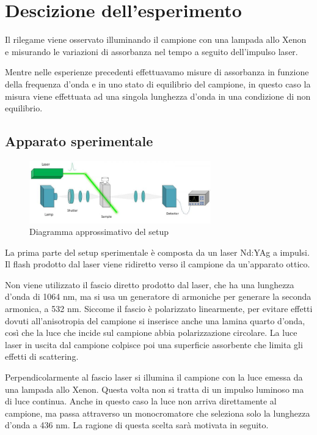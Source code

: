 \documentclass[11pt, a4paper]{article}
\begin{document}
\section{Descizione dell'esperimento}

Il rilegame viene osservato illuminando il campione con una lampada allo Xenon e misurando le variazioni di assorbanza nel tempo a seguito dell'impulso laser.

Mentre nelle esperienze precedenti effettuavamo misure di assorbanza in funzione della frequenza d'onda e in uno stato di equilibrio del campione,
in questo caso la misura viene effettuata ad una singola lunghezza d'onda in una condizione di non equilibrio.

\subsection{Apparato sperimentale}

\begin{figure}[H]
    \centering
    \includegraphics[width=0.7\textwidth]{FlashPhotolysis.jpg}
    \caption{Diagramma approssimativo del setup}
\end{figure}

La prima parte del setup sperimentale è composta da un laser Nd:YAg a impulsi. Il flash prodotto dal laser viene ridiretto verso il campione da un'apparato ottico.

Non viene utilizzato il fascio diretto prodotto dal laser, che ha una lunghezza d'onda di 1064 nm, ma si usa un generatore di armoniche per generare la seconda armonica, a 532 nm.
Siccome il fascio è polarizzato linearmente, per evitare effetti dovuti all'anisotropia del campione si inserisce anche una lamina quarto d'onda, così che la luce che incide
sul campione abbia polarizzazione circolare. La luce laser in uscita dal campione colpisce poi una superficie assorbente che limita gli effetti di scattering.

Perpendicolarmente al fascio laser si illumina il campione con la luce emessa da una lampada allo Xenon. Questa volta non si tratta di un impulso luminoso
ma di luce continua.
Anche in questo caso la luce non arriva direttamente al campione, ma passa attraverso un monocromatore che
seleziona solo la lunghezza d'onda a 436 nm. La ragione di questa scelta sarà motivata in seguito.
\end{document}
